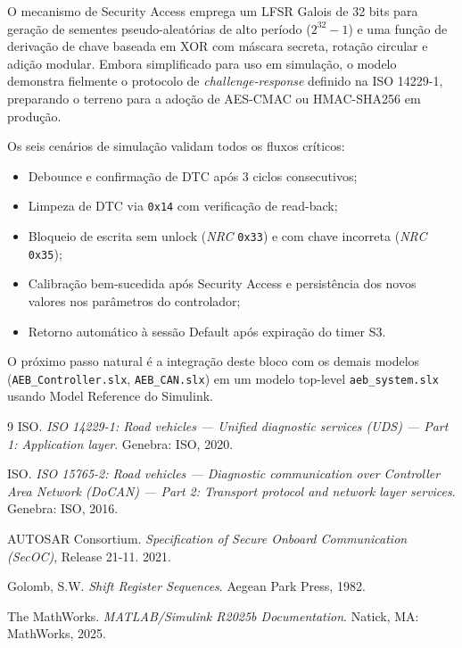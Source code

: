 \documentclass[12pt,a4paper]{article}
\newcommand{\sid}[1]{\texttt{0x#1}}
\begin{document}
O mecanismo de Security Access emprega um LFSR Galois de 32 bits para
geração de sementes pseudo-aleatórias de alto período ($2^{32} - 1$) e
uma função de derivação de chave baseada em XOR com máscara secreta,
rotação circular e adição modular. Embora simplificado para uso em
simulação, o modelo demonstra fielmente o protocolo de
\textit{challenge-response} definido na ISO 14229-1, preparando o terreno
para a adoção de AES-CMAC ou HMAC-SHA256 em produção.

Os seis cenários de simulação validam todos os fluxos críticos:
\begin{itemize}[noitemsep]
    \item Debounce e confirmação de DTC após 3 ciclos consecutivos;
    \item Limpeza de DTC via \sid{14} com verificação de read-back;
    \item Bloqueio de escrita sem unlock (\textit{NRC} \texttt{0x33}) e
          com chave incorreta (\textit{NRC} \texttt{0x35});
    \item Calibração bem-sucedida após Security Access e persistência dos
          novos valores nos parâmetros do controlador;
    \item Retorno automático à sessão Default após expiração do timer S3.
\end{itemize}

O próximo passo natural é a integração deste bloco com os demais modelos
(\texttt{AEB\_Controller.slx}, \texttt{AEB\_CAN.slx}) em um modelo
top-level \texttt{aeb\_system.slx} usando Model Reference do Simulink.

\begin{thebibliography}{9}
    ISO. \textit{ISO 14229-1: Road vehicles --- Unified diagnostic services
    (UDS) --- Part 1: Application layer}. Genebra: ISO, 2020.

    ISO. \textit{ISO 15765-2: Road vehicles --- Diagnostic communication
    over Controller Area Network (DoCAN) --- Part 2: Transport protocol and
    network layer services}. Genebra: ISO, 2016.

    AUTOSAR Consortium. \textit{Specification of Secure Onboard Communication
    (SecOC)}, Release 21-11. 2021.

    Golomb, S.W. \textit{Shift Register Sequences}. Aegean Park Press, 1982.

    The MathWorks. \textit{MATLAB/Simulink R2025b Documentation}.
    Natick, MA: MathWorks, 2025.
\end{thebibliography}
\end{document}
